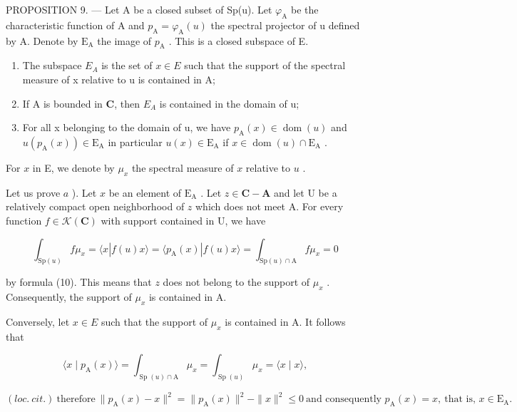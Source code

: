 PROPOSITION 9. --- Let A be a closed subset of Sp(u). Let \(\varphi_{\mathrm{A}}\) be the characteristic function of A and \(p_{\mathrm{A}} = \varphi_{\mathrm{A}}(u)\) the spectral projector of u defined by A. Denote by \(\mathrm{E}_{\mathrm{A}}\) the image of \(p_{\mathrm{A}}\) . This is a closed subspace of E.

\begin{enumerate}
\def\labelenumi{\alph{enumi})}
\item
  The subspace \(E_{A}\) is the set of \(x \in E\) such that the support of the spectral measure of x relative to u is contained in A;
\item
  If A is bounded in \(\mathbf C\), then \(E_{A}\) is contained in the domain of u;
\item
  For all x belonging to the domain of u, we have \(p_{\mathrm{A}}(x) \in \operatorname{dom}(u)\) and \(u(p_{\mathrm{A}}(x)) \in \mathrm{E}_{\mathrm{A}}\) in particular \(u(x) \in \mathrm{E}_{\mathrm{A}}\) if \(x \in \operatorname{dom}(u) \cap \mathrm{E}_{\mathrm{A}}\) .
\end{enumerate}

For \(x\) in E, we denote by \(\mu_x\) the spectral measure of \(x\) relative to \(u\) .

Let us prove \(a\) ). Let \(x\) be an element of \(\mathrm{E}_{\mathrm{A}}\) . Let \(z \in \mathbf{C} - \mathbf{A}\) and let U be a relatively compact open neighborhood of \(z\) which does not meet A. For every function \(f \in \mathcal{K}(\mathbf{C})\) with support contained in U, we have

\[
\int_ {\mathrm{Sp} (u)} f \mu_ {x} = \langle x | f (u) x \rangle = \langle p _ {\mathrm{A}} (x) | f (u) x \rangle = \int_ {\mathrm{Sp} (u) \cap \mathrm{A}} f \mu_ {x} = 0
\]

by formula (10). This means that \(z\) does not belong to the support of \(\mu_x\) . Consequently, the support of \(\mu_x\) is contained in A.

Conversely, let \(x \in E\) such that the support of \(\mu_{x}\) is contained in A. It follows that

\[
\langle x \mid p _ {\mathrm{A}} (x) \rangle = \int_ {\operatorname{Sp} (u) \cap \mathrm{A}} \mu_ {x} = \int_ {\operatorname{Sp} (u)} \mu_ {x} = \langle x \mid x \rangle ,
\]

\((loc. \ cit.) \ \text{therefore} \ \|p_{\mathrm{A}}(x)-x\|^{2} = \|p_{\mathrm{A}}(x)\|^{2} - \|x\|^{2} \leqslant 0 \ \text{and consequently } p_{\mathrm{A}}(x) = x, \ \text{that is, } x \in \mathrm{E}_{\mathrm{A}}.\)

